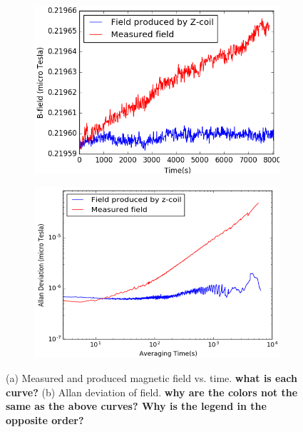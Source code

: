 \begin{figure}
  \centering
  \begin{subfigure}[b]{0.67\textwidth}
    \centering
    \includegraphics[width=\textwidth]{figures/field_coil_current.png}
    \caption{}
    \label{fig:field_measure_and_produced}
  \end{subfigure}
  \begin{subfigure}[b]{0.65\textwidth}
    \centering
    \includegraphics[width=\textwidth]{figures/field_current_allan_plot.png}
    \caption{}
    \label{fig:allan_plot}
  \end{subfigure}
  \caption{(a) Measured and produced magnetic field vs. time. {\bf
      what is each curve?}  (b) Allan deviation of field. {\bf why are
      the colors not the same as the above curves?  Why is the legend
      in the opposite order?}}
  \label{fig:current_vs_field_allan_deviation}
\end{figure} 

